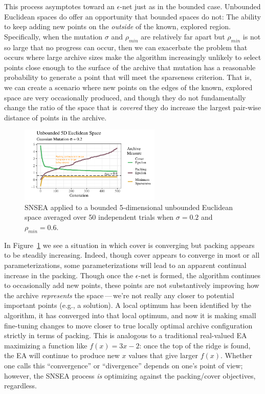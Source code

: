 \documentclass[twoside]{article}
\begin{document}
This process asymptotes toward an $\epsilon$-net just as in the bounded case.  Unbounded Euclidean spaces do offer an opportunity that bounded spaces do not:  The ability to keep adding new points on the \emph{outside} of the known, explored region.  Specifically, when the mutation $\sigma$ and $\rho_{min}$ are relatively far apart but $\rho_{min}$ is not so large that no progress can occur, then we can exacerbate the problem that occurs where large archive sizes make the algorithm increasingly unlikely to select points close enough to the surface of the archive that mutation has a reasonable probability to generate a point that will meet the sparseness criterion.  That is, we can create a scenario where new points on the edges of the known, explored space are very occasionally produced, and though they do not fundamentally change the ratio of the space that is \emph{covered} they do increase the largest pair-wise distance of points in the archive.
%
\begin{figure}[h]
  \center\includegraphics[width=0.6\textwidth]{Figures/unbounded-s02-r06-NOPOP.pdf}
  \caption{\label{fig:unbounded:nopop:0206} SNSEA applied to a bounded 5-dimensional unbounded Euclidean space averaged over 50 independent trials when $\sigma=0.2$ and $\rho_{min}=0.6$.}
\end{figure}

In Figure~\ref{fig:unbounded:nopop:0206} we see a situation in which cover is converging but packing appears to be steadily increasing.  Indeed, though cover appears to converge in most or all parameterizations, some parameterizations will lead to an apparent continual increase in the packing.  Though once the $\epsilon$-net is formed, the algorithm continues to occasionally add new points, these points are not substantively improving how the archive \emph{represents} the space\,---\,we're not really any closer to potential important points (e.g., a solution).  A local optimum has been identified by the algorithm, it has converged into that local optimum, and now it is making small fine-tuning changes to move closer to true locally optimal archive configuration strictly in terms of packing. This is analogous to a traditional real-valued EA maximizing a function like $f(x)=3x - 2$: once the top of the ridge is found, the EA will continue to produce new $x$ values that give larger $f(x)$.  Whether one calls this ``convergence'' or ``divergence'' depends on one's point of view; however, the SNSEA process \emph{is} optimizing against the packing/cover objectives, regardless.
\end{document}
